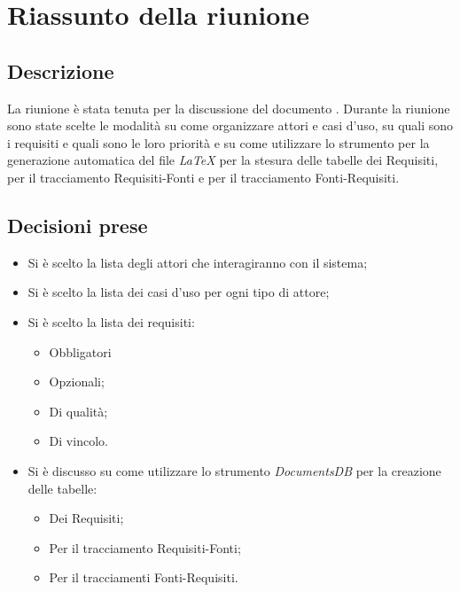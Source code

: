 \section{Riassunto della riunione}
\subsection{Descrizione}

La riunione è stata tenuta per la discussione del documento \AdR. Durante la riunione sono state scelte le modalità su come organizzare attori e casi d'uso, su quali sono i requisiti e quali sono le loro priorità e su come utilizzare lo strumento per la generazione automatica del file \textit{\LaTeX {}} per la stesura delle tabelle dei Requisiti, per il tracciamento Requisiti-Fonti e per il tracciamento Fonti-Requisiti.

\subsection{Decisioni prese}
\begin{itemize}
\item Si è scelto la lista degli attori che interagiranno con il sistema;
\item Si è scelto la lista dei casi d'uso per ogni tipo di attore;
\item Si è scelto la lista dei requisiti:  
	\begin{itemize}
		\item Obbligatori  
		\item Opzionali;
		\item Di qualità; 
		\item Di vincolo.
	\end{itemize}
\item Si è discusso su come utilizzare lo strumento \textit{DocumentsDB} per la creazione delle tabelle:
	\begin{itemize}
		\item Dei Requisiti;
		\item Per il tracciamento Requisiti-Fonti;
		\item Per il tracciamenti Fonti-Requisiti.
	\end{itemize}
\end{itemize}